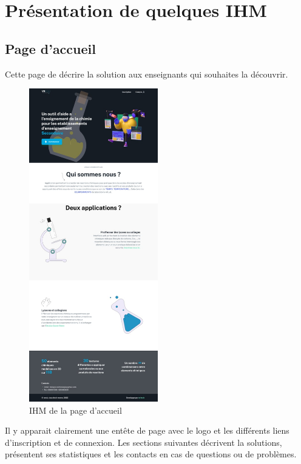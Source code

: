\section{Présentation de quelques IHM}

\subsection{Page d'accueil}

Cette page de décrire la solution aux enseignants qui souhaites la découvrir.

\begin{figure}[H]
	\centering
	\includegraphics[width=0.5\textwidth]{img/home}
	\caption{IHM de la page d'accueil}
	\label{fig:mesh1}
\end{figure}

Il y apparait clairement une entête de page avec le logo et les différents liens d'inscription et de connexion.
Les sections suivantes décrivent la solutions, présentent ses statistiques et les contacts en cas de questions ou de problèmes.

